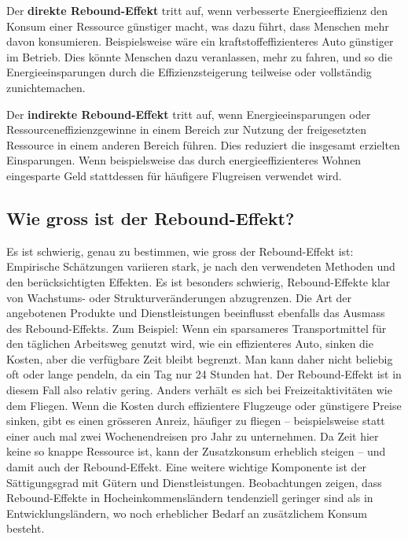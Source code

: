 \documentclass[
  nswissgerman,
  a4paper,
  openany]{book}
\begin{document}
\begin{tcolorbox}[enhanced jigsaw, arc=.35mm, bottomrule=.15mm, bottomtitle=1mm, breakable, colback=white, colbacktitle=quarto-callout-note-color!10!white, colframe=quarto-callout-note-color-frame, coltitle=black, left=2mm, leftrule=.75mm, opacityback=0, opacitybacktitle=0.6, rightrule=.15mm, title={Rebound-Effekte}, titlerule=0mm, toprule=.15mm, toptitle=1mm]

Der \textbf{direkte Rebound-Effekt} tritt auf, wenn verbesserte
Energieeffizienz den Konsum einer Ressource günstiger macht, was dazu
führt, dass Menschen mehr davon konsumieren. Beispielsweise wäre ein
kraftstoffeffizienteres Auto günstiger im Betrieb. Dies könnte Menschen
dazu veranlassen, mehr zu fahren, und so die Energieeinsparungen durch
die Effizienzsteigerung teilweise oder vollständig zunichtemachen.

Der \textbf{indirekte Rebound-Effekt} tritt auf, wenn
Energieeinsparungen oder Ressourceneffizienzgewinne in einem Bereich zur
Nutzung der freigesetzten Ressource in einem anderen Bereich führen.
Dies reduziert die insgesamt erzielten Einsparungen. Wenn beispielsweise
das durch energieeffizienteres Wohnen eingesparte Geld stattdessen für
häufigere Flugreisen verwendet wird.

\end{tcolorbox}

\subsection{Wie gross ist der
Rebound-Effekt?}\label{wie-gross-ist-der-rebound-effekt}

Es ist schwierig, genau zu bestimmen, wie gross der Rebound-Effekt ist:
Empirische Schätzungen variieren stark, je nach den verwendeten Methoden
und den berücksichtigten Effekten. Es ist besonders schwierig,
Rebound-Effekte klar von Wachstums- oder Strukturveränderungen
abzugrenzen. Die Art der angebotenen Produkte und Dienstleistungen
beeinflusst ebenfalls das Ausmass des Rebound-Effekts. Zum Beispiel:
Wenn ein sparsameres Transportmittel für den täglichen Arbeitsweg
genutzt wird, wie ein effizienteres Auto, sinken die Kosten, aber die
verfügbare Zeit bleibt begrenzt. Man kann daher nicht beliebig oft oder
lange pendeln, da ein Tag nur 24 Stunden hat. Der Rebound-Effekt ist in
diesem Fall also relativ gering. Anders verhält es sich bei
Freizeitaktivitäten wie dem Fliegen. Wenn die Kosten durch effizientere
Flugzeuge oder günstigere Preise sinken, gibt es einen grösseren Anreiz,
häufiger zu fliegen -- beispielsweise statt einer auch mal zwei
Wochenendreisen pro Jahr zu unternehmen. Da Zeit hier keine so knappe
Ressource ist, kann der Zusatzkonsum erheblich steigen -- und damit auch
der Rebound-Effekt. Eine weitere wichtige Komponente ist der
Sättigungsgrad mit Gütern und Dienstleistungen. Beobachtungen zeigen,
dass Rebound-Effekte in Hocheinkommensländern tendenziell geringer sind
als in Entwicklungsländern, wo noch erheblicher Bedarf an zusätzlichem
Konsum besteht.
\end{document}
